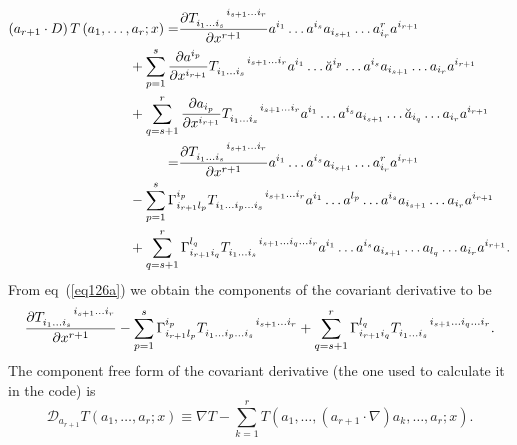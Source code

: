 \documentclass[12pt]{report}
\newcommand{\bfrac}[2]{\displaystyle\frac{#1}{#2}}
\newcommand{\lp}{\left (}
\newcommand{\rp}{\right )}
\newcommand{\pdiff}[2]{\bfrac{\partial {#1}}{\partial {#2}}}
\newcommand{\f}[2]{{#1}\lp {#2} \rp}
\newcommand{\paren}[1]{\lp {#1} \rp}
\begin{document}
\begin{align}
    \paren{a_{r+1}\cdot D} \f{T}{a_{1},\dots,a_{r};x} =&
        \pdiff{T\indices{_{i_{1}\dots i_{s}}^{i_{s+1}\dots i_{r}}}}{x^{r+1}}a^{i_{1}}\dots a^{i_{s}}a_{i_{s+1}}\dots a^{r}_{i_{r}}
        a^{i_{r+1}} \nonumber \\
        &\hspace{-0.5in}+ \sum_{p=1}^{s}\pdiff{a^{i_{p}}}{x^{i_{r+1}}}T\indices{_{i_{1}\dots i_{s}}^{i_{s+1}\dots i_{r}}}a^{i_{1}}\dots
        \breve{a}^{i_{p}}\dots a^{i_{s}}a_{i_{s+1}}\dots a_{i_{r}}a^{i_{r+1}} \nonumber \\
        &\hspace{-0.5in}+ \sum_{q=s+1}^{r}\pdiff{a_{i_{p}}}{x^{i_{r+1}}}T\indices{_{i_{1}\dots i_{s}}^{i_{s+1}\dots i_{r}}}a^{i_{1}}\dots
        a^{i_{s}}a_{i_{s+1}}\dots\breve{a}_{i_{q}}\dots a_{i_{r}}a^{i_{r+1}} \nonumber \\
        =& \pdiff{T\indices{_{i_{1}\dots i_{s}}^{i_{s+1}\dots i_{r}}}}{x^{r+1}}a^{i_{1}}\dots a^{i_{s}}a_{i_{s+1}}\dots a^{r}_{i_{r}}
        a^{i_{r+1}} \nonumber \\
        &\hspace{-0.5in}- \sum_{p=1}^{s}\Gamma_{i_{r+1}l_{p}}^{i_{p}}T\indices{_{i_{1}\dots i_{p}\dots i_{s}}^{i_{s+1}
        \dots i_{r}}}a^{i_{1}}\dots
        a^{l_{p}}\dots a^{i_{s}}a_{i_{s+1}}\dots a_{i_{r}}a^{i_{r+1}} \nonumber \\
        &\hspace{-0.5in}+ \sum_{q=s+1}^{r}\Gamma_{i_{r+1}i_{q}}^{l_{q}}T\indices{_{i_{1}\dots i_{s}}^{i_{s+1}\dots i_{q}
        \dots i_{r}}}a^{i_{1}}\dots
        a^{i_{s}}a_{i_{s+1}}\dots a_{l_{q}}\dots a_{i_{r}}a^{i_{r+1}}   .   \label{eq126a}
\end{align}
From eq~(\ref{eq126a}) we obtain the components of the covariant derivative to be
\begin{align}
    \pdiff{T\indices{_{i_{1}\dots i_{s}}^{i_{s+1}\dots i_{r}}}}{x^{r+1}}
    - \sum_{p=1}^{s}\Gamma_{i_{r+1}l_{p}}^{i_{p}}T\indices{_{i_{1}\dots i_{p}\dots i_{s}}^{i_{s+1}\dots i_{r}}}
    + \sum_{q=s+1}^{r}\Gamma_{i_{r+1}i_{q}}^{l_{q}}T\indices{_{i_{1}\dots i_{s}}^{i_{s+1}\dots i_{q}\dots i_{r}}}.
\end{align}
The component free form of the covariant derivative (the one used to calculate it in the code) is
\begin{equation}
    \mathcal{D}_{a_{r+1}} \f{T}{a_{1},\dots,a_{r};x} \equiv \nabla T
        - \sum_{k=1}^{r}\f{T}{a_{1},\dots,\paren{a_{r+1}\cdot\nabla} a_{k},\dots,a_{r};x}.
\end{equation}
\end{document}
